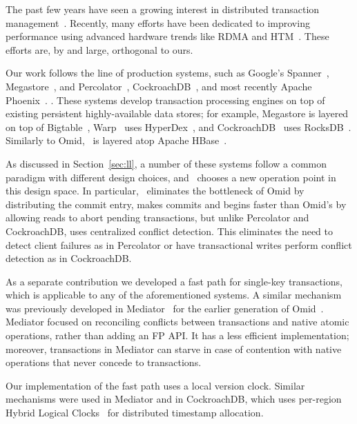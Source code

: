

The past few years have seen a growing interest in distributed 
transaction management~\cite{PattersonENAA12,Cowling2012,Aguilera2015,Balakrishnan2013,Thomson2012,eyal2013ordering,Warp}.
Recently, many efforts have been dedicated to improving performance using advanced 
hardware trends like RDMA and HTM~\cite{Wei2015,Dragojevic2014,Dragojevic2015}.  
These efforts are, by and large, orthogonal to ours.

Our work follows the line of production systems, such as 
Google's Spanner~\cite{Spanner2012}, Megastore~\cite{Megastore}, and Percolator~\cite{Percolator2010}, 
CockroachDB~\cite{cockroach}, and most recently Apache Phoenix~\cite{Phoenix}. 
. These systems develop transaction processing engines on top of existing persistent 
highly-available data stores; for example, Megastore is layered on top of
Bigtable~\cite{Chang2008}, Warp~\cite{Warp} uses HyperDex~\cite{Escriva2012}, 
and CockroachDB~\cite{cockroach} uses RocksDB~\cite{rocksdb}.
Similarly to Omid, \sys\ is layered atop Apache HBase~\cite{hbase}.

As discussed in Section~\ref{sec:ll}, a number of these systems follow a common paradigm
with different design choices, and \sys\ chooses a new operation point in 
this design space. In particular, \sys\ eliminates the bottleneck of Omid by
distributing the commit entry, makes commits and begins faster than Omid's by 
allowing reads to abort pending transactions, but unlike Percolator and CockroachDB, 
uses centralized conflict detection. This eliminates the need to detect client 
failures as in Percolator or have transactional writes perform conflict detection 
as in CockroachDB. 

As a separate contribution we developed a fast path for single-key transactions,
which is applicable to any of the aforementioned systems. A similar mechanism 
was previously developed in Mediator~\cite{mediator} for the earlier generation 
of Omid~\cite{OmidICDE2014}. Mediator focused on reconciling conflicts between 
transactions and native atomic operations, rather than adding an FP API. It has a 
less efficient implementation; moreover, transactions in Mediator can starve in case 
of contention with native operations that never concede to transactions.

Our implementation of the fast path uses a local version clock. Similar mechanisms
were used in Mediator and in CockroachDB, which uses 
per-region Hybrid Logical Clocks~\cite{Kulkarni2014LogicalPC} for distributed timestamp allocation. 

